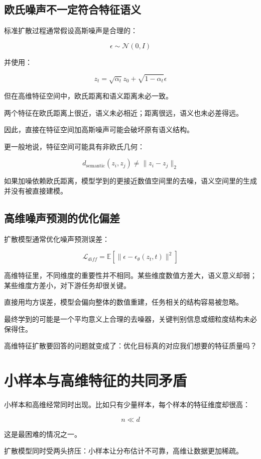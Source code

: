 \subsection{欧氏噪声不一定符合特征语义}

标准扩散过程通常假设高斯噪声是合理的：

\[
\epsilon \sim \mathcal{N}(0,I)
\]

并使用：

\[
z_t = \sqrt{\alpha_t}z_0 + \sqrt{1-\alpha_t}\epsilon
\]

但在高维特征空间中，欧氏距离和语义距离未必一致。

两个特征在欧氏距离上很近，语义未必相近；距离很远，语义也未必差得远。

因此，直接在特征空间加高斯噪声可能会破坏原有语义结构。

更一般地说，特征空间可能具有非欧氏几何：

\[
d_{\text{semantic}}(z_i,z_j) \neq \|z_i-z_j\|_2
\]

如果加噪依赖欧氏距离，模型学到的更接近数值空间里的去噪，语义空间里的生成并没有被直接建模。

\subsection{高维噪声预测的优化偏差}

扩散模型通常优化噪声预测误差：

\[
\mathcal{L}_{diff}=
\mathbb{E}
\left[
\|\epsilon - \epsilon_\theta(z_t,t)\|^2
\right]
\]

高维特征里，不同维度的重要性并不相同。某些维度数值方差大，语义意义却弱；某些维度方差小，对下游任务却很关键。

直接用均方误差，模型会偏向整体的数值重建，任务相关的结构容易被忽略。

最终学到的可能是一个平均意义上合理的去噪器，关键判别信息或细粒度结构未必保得住。

高维特征扩散要回答的问题就变成了：优化目标真的对应我们想要的特征质量吗？

\section{小样本与高维特征的共同矛盾}

小样本和高维经常同时出现。比如只有少量样本，每个样本的特征维度却很高：

\[
n \ll d
\]

这是最困难的情况之一。

扩散模型同时受两头挤压：小样本让分布估计不可靠，高维让数据更加稀疏。

